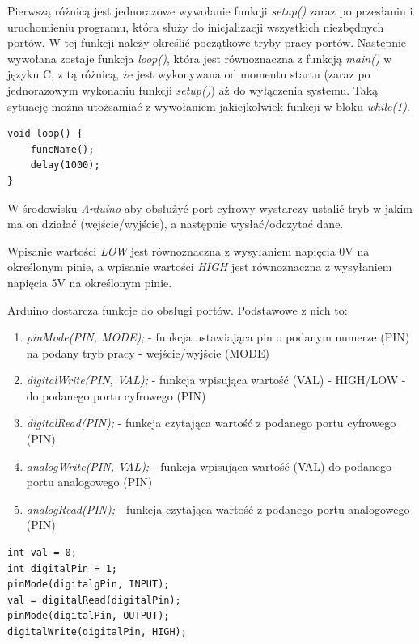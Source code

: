 \documentclass{xmgr}
\begin{document}
Pierwszą różnicą jest jednorazowe wywołanie funkcji \emph{setup()} zaraz po przesłaniu i uruchomieniu programu, która służy do inicjalizacji wszystkich niezbędnych portów. W tej funkcji należy określić początkowe tryby pracy portów. Następnie wywołana zostaje funkcja \emph{loop()}, która jest równoznaczna z funkcją \emph{main()} w języku C, z tą różnicą, że jest wykonywana od momentu startu (zaraz po jednorazowym wykonaniu funkcji \emph{setup()}) aż do wyłączenia systemu. Taką sytuację można utożsamiać z wywołaniem jakiejkolwiek funkcji w bloku \emph{while(1)}.

\begin{lstlisting}[label=bot-dirs-alg,caption=Odpytywanie funkcji w nieskończonej pętli w środowisku Arduino]
void loop() {
	funcName();
	delay(1000);
}
\end{lstlisting}

W środowisku \emph{Arduino} aby obsłużyć port cyfrowy wystarczy ustalić tryb w jakim ma on działać (wejście/wyjście), a następnie wysłać/odczytać dane.

Wpisanie wartości \emph{LOW} jest równoznaczna z wysyłaniem napięcia 0V na określonym pinie, a wpisanie wartości \emph{HIGH} jest równoznaczna z wysyłaniem napięcia 5V na określonym pinie.

Arduino dostarcza funkcje do obsługi portów. Podstawowe z nich to:

\begin{enumerate}
	\item \emph{pinMode(PIN, MODE);} - funkcja ustawiająca pin o podanym numerze (PIN) na podany tryb pracy - wejście/wyjście (MODE)
	\item \emph{digitalWrite(PIN, VAL);} - funkcja wpisująca wartość (VAL) - HIGH/LOW - do podanego portu cyfrowego (PIN)
	\item \emph{digitalRead(PIN);} - funkcja czytająca wartość z podanego portu cyfrowego (PIN)
	\item \emph{analogWrite(PIN, VAL);} - funkcja wpisująca wartość (VAL) do podanego portu analogowego (PIN)
	\item \emph{analogRead(PIN);}  - funkcja czytająca wartość z podanego portu analogowego (PIN)
\end{enumerate}

\begin{lstlisting}[label=bot-dirs-alg,caption=Obsługa portu cyfrowego w środowisku Arduino]
int val = 0;
int digitalPin = 1;	
pinMode(digitalgPin, INPUT);
val = digitalRead(digitalPin);
pinMode(digitalPin, OUTPUT);
digitalWrite(digitalPin, HIGH);
\end{lstlisting}
\end{document}
